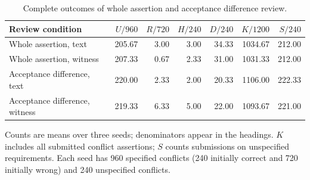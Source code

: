 \begin{table}[t]
\centering
\small
\caption{Complete outcomes of whole assertion and acceptance difference review.}
\label{tab:s_review_outcomes}
\begin{tabular}{lrrrrrr}
\toprule
Review condition & $U/960$ & $R/720$ & $H/240$ & $D/240$ & $K/1200$ & $S/240$ \\
\midrule
Whole assertion, text & 205.67 & 3.00 & 3.00 & 34.33 & 1034.67 & 212.00 \\
Whole assertion, witness & 207.33 & 0.67 & 2.33 & 31.00 & 1031.33 & 212.00 \\
Acceptance difference, text & 220.00 & 2.33 & 2.00 & 20.33 & 1106.00 & 222.33 \\
Acceptance difference, witness & 219.33 & 6.33 & 5.00 & 22.00 & 1093.67 & 221.00 \\
\bottomrule
\end{tabular}
\par\smallskip
\begin{minipage}{\linewidth}
\footnotesize
Counts are means over three seeds; denominators appear in the headings. $K$ includes all submitted conflict assertions; $S$ counts submissions on unspecified requirements. Each seed has 960 specified conflicts (240 initially correct and 720 initially wrong) and 240 unspecified conflicts.
\end{minipage}
\end{table}
